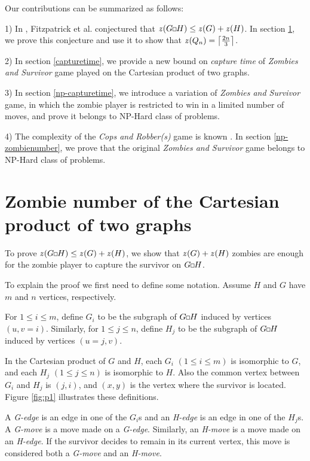 \documentclass[1p]{elsarticle}
\DeclarePairedDelimiter\ceil{\lceil}{\rceil} \DeclarePairedDelimiter\floor{\lfloor}{\rfloor}
\newcommand{\zn}{\ooalign{$z$\cr\hfil\rule[.5ex]{.2em}{.08ex}\hfil\cr}}
\newcommand{\sq}[1][black]{%
\begin{tikzpicture}                                                           
  \draw[#1] (2pt,0pt) -- (6pt,0pt);   
  \draw[#1] (2pt,0pt) -- (2pt,4pt);    
  \draw[#1] (2pt,4pt) -- (6pt,4pt);   
  \draw[#1] (6pt,0pt) -- (6pt,4pt);
\end{tikzpicture}%
}
\begin{document}
Our contributions can be summarized as follows:

1) In \cite{Fitz16}, Fitzpatrick et al. conjectured that $\zn(G \sq H) \leq \zn(G) + \zn(H)$. In section \ref{conj-proof}, we prove this conjecture and
use it to show that $\zn(Q_n) = \ceil*{\frac{2n}{3}}$. 

2) In section \ref{capturetime}, we provide a new bound on {\it capture time} of {\it Zombies and Survivor} game played on the Cartesian
product of two graphs. 

3) In section \ref{np-capturetime}, we introduce a variation of {\it Zombies and Survivor} game, in which the zombie
player is restricted to win in a limited number of moves, and prove it belongs to NP-Hard class of problems.

4) The complexity of the {\it Cops and Robber(s)} game is known \cite{Kinnersley15}. In section \ref{np-zombienumber},
we prove that the original {\it Zombies and Survivor} game belongs to NP-Hard class of problems.


\section{Zombie number of the Cartesian product of two graphs}\label{conj-proof}

To prove $\zn(G \sq H) \leq \zn(G) + \zn(H)$, we show that $\zn(G) + \zn(H)$ zombies are enough for the zombie player to
capture the survivor on $G \sq H$.

To explain the proof we first need to define some notation. Assume $H$ and $G$ have $m$ and $n$ vertices,
respectively. 

For $1 \leq i \leq m$, define $G_i$ to be the subgraph of $G \sq H$ induced by vertices $(u,v = i)$. Similarly, for $1 \leq j \leq
n$, define $H_{j}$ to be the subgraph of $G \sq H$ induced by vertices $(u = j,v)$.

In the Cartesian product of $G$ and $H$, each $G_{i}$ $(1 \leq i \leq m)$ is isomorphic to $G$, and each $H_{j}$ $(1
\leq j \leq n)$ is isomorphic to $H$. Also the common vertex between $G_{i}$ and $H_{j}$ is $(j,i)$, and $(x,y)$ is the
vertex where the survivor is located. Figure \ref{fig:p1} illustrates these definitions.

A {\it G-edge} is an edge in one of the $G_{i}$s and an {\it H-edge} is an edge in one of the $H_{j}$s. A {\it G-move}
is a move made on a {\it G-edge}. Similarly, an {\it H-move} is a move made on an {\it H-edge}. If the survivor decides
to remain in its current vertex, this move is considered both a {\it G-move} and an {\it H-move}. 
\end{document}
